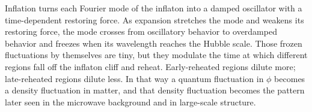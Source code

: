 Inflation turns each Fourier mode of the inflaton into a damped oscillator with a time-dependent restoring force. As expansion stretches the mode and weakens its restoring force, the mode crosses from oscillatory behavior to overdamped behavior and freezes when its wavelength reaches the Hubble scale. Those frozen fluctuations by themselves are tiny, but they modulate the time at which different regions fall off the inflaton cliff and reheat. Early-reheated regions dilute more; late-reheated regions dilute less. In that way a quantum fluctuation in \(\phi\) becomes a density fluctuation in matter, and that density fluctuation becomes the pattern later seen in the microwave background and in large-scale structure.
